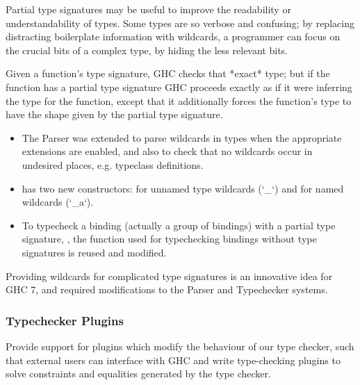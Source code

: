 Partial type signatures may be useful to improve the readability or understandability of types. Some types are so verbose and confusing; by replacing distracting boilerplate information with wildcards, a programmer can focus on the crucial bits of a complex type, by hiding the less relevant bits.

Given a function's type signature, GHC checks that *exact* type; but if the function has a partial type signature GHC proceeds exactly
as if it were inferring the type for the function, except that it additionally forces the function's type to have the shape given by the partial type signature.

\begin{itemize}
    \item The Parser was extended to parse wildcards in types when the appropriate extensions are enabled, and also to check that no wildcards occur in undesired places, e.g. typeclass definitions.

    \item {} has two new constructors:  for unnamed type wildcards (`\_`) and  for named wildcards (`\_a`).
    
    \item To typecheck a binding (actually a group of bindings) with a partial type signature, , the function used for typechecking bindings without type signatures is reused and modified. 
\end{itemize}
  
\begin{new}
Providing wildcards for complicated type signatures is an innovative idea for GHC 7, and required modifications to the Parser and Typechecker systems.
\end{new}


\subsubsection{Typechecker Plugins}

\begin{requirement}
Provide support for plugins which modify the behaviour of our type checker, such that external users can interface with GHC and write type-checking plugins to solve constraints and equalities generated by the type checker. \cite{wiki}
\end{requirement}


